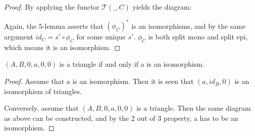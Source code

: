 \begin{proof}
        By applying the functor $\mathcal{T}(\_,C)$ yields the diagram:
        \begin{center}
        \end{center}
        Again, the 5-lemma asserts that $(\phi_C)^*$ is an isomorphisms, and by the same argument $id_{C} = s'\circ\phi_C$ for some unique $s'$. $\phi_C$ is both split mono and split epi, which means it is an isomorphism.
    \end{proof}

    \begin{corollary}
        $(A,B,0,a,0,0)$ is a triangle if and only if a is an isomorphism.
    \end{corollary}

    \begin{proof}
        Assume that a is an isomorphism. Then it is seen that $(a,id_B,0)$ is an isomorphism of triangles.
        \begin{center}
        \end{center}
        Conversely, assume that $(A,B,0,a,0,0)$ is a triangle. Then the same diagram as above can be constructed, and by the 2 out of 3 property, a has to be an isomorphism.
    \end{proof}

